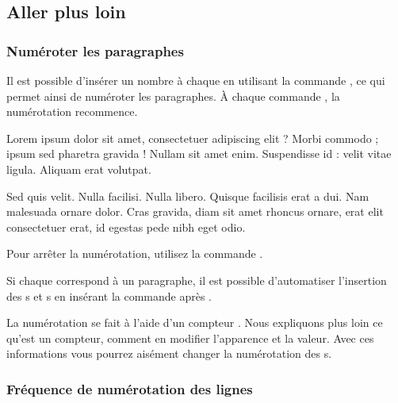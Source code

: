 \subsection{Aller plus loin}

\subsubsection{Numéroter les paragraphes}

Il est possible d'insérer un nombre à chaque  en utilisant la commande \label{numberpstarttrue}, ce qui permet ainsi de numéroter les paragraphes. À chaque commande , la numérotation recommence.

\begin{minipage}{0.8\textwidth}
\numberpstarttrue
\beginnumbering
\pstart 
Lorem ipsum dolor sit amet, consectetuer adipiscing elit ?
Morbi commodo ; ipsum sed pharetra gravida !
Nullam sit amet enim. Suspendisse id : velit vitae ligula. 
Aliquam erat volutpat. \pend


\pstart Sed quis velit. Nulla facilisi. Nulla libero. 
 Quisque facilisis erat a dui.
Nam malesuada ornare dolor.
Cras gravida, diam sit amet rhoncus ornare, 
erat  elit consectetuer erat, id egestas pede nibh eget odio.
\pend
\endnumbering
\end{minipage}

Pour arrêter la numérotation,  utilisez la commande .

\begin{plusloins}
Si chaque  correspond à un paragraphe, il est possible d'automatiser l'insertion des s et s en insérant la commande  après .
\end{plusloins}

\begin{plusloins}
La numérotation se fait à l'aide d'un compteur . Nous expliquons plus loin ce qu'est un compteur, comment en modifier l'apparence et la valeur. Avec ces informations vous pourrez aisément changer la numérotation des s.
\end{plusloins}

\subsubsection{Fréquence de numérotation des lignes}

